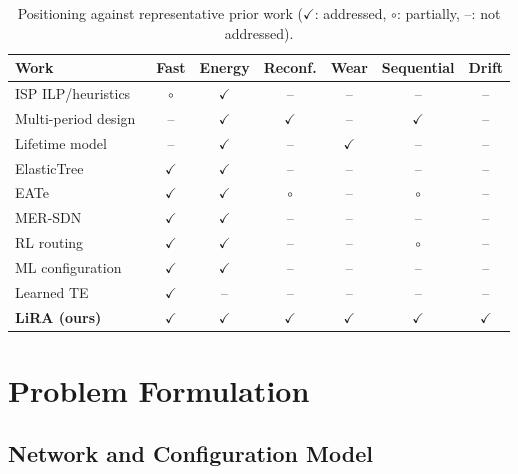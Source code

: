 \documentclass[conference]{IEEEtran}
\begin{document}
\begin{table}[t]
\centering
\caption{Positioning against representative prior work ($\checkmark$: addressed, $\circ$: partially, --: not addressed).}
\label{tab:related}
\footnotesize
\setlength{\tabcolsep}{3.2pt}
\begin{tabular}{@{}lcccccc@{}}
\toprule
Work & Fast & Energy & Reconf. & Wear & Sequential & Drift \\
\midrule
ISP ILP/heuristics~\cite{chiaraviglio2012minimizing} & $\circ$ & $\checkmark$ & -- & -- & -- & -- \\
Multi-period design~\cite{bonetto2013multiperiod} & -- & $\checkmark$ & $\checkmark$ & -- & $\checkmark$ & -- \\
Lifetime model~\cite{chiaraviglio2015lifetime} & -- & $\checkmark$ & -- & $\checkmark$ & -- & -- \\
ElasticTree~\cite{heller2010elastictree} & $\checkmark$ & $\checkmark$ & -- & -- & -- & -- \\
EATe~\cite{vasic2010eate} & $\checkmark$ & $\checkmark$ & $\circ$ & -- & $\circ$ & -- \\
MER-SDN~\cite{assefa2018mersdn} & $\checkmark$ & $\checkmark$ & -- & -- & -- & -- \\
RL routing~\cite{frohlich2021rl} & $\checkmark$ & $\checkmark$ & -- & -- & $\circ$ & -- \\
ML configuration~\cite{gomezdelahiz2025noms,gomezdelahiz2026tgcn} & $\checkmark$ & $\checkmark$ & -- & -- & -- & -- \\
Learned TE~\cite{xu2023teal,perry2023dote} & $\checkmark$ & -- & -- & -- & -- & -- \\
\midrule
\textbf{LiRA (ours)} & $\checkmark$ & $\checkmark$ & $\checkmark$ & $\checkmark$ & $\checkmark$ & $\checkmark$ \\
\bottomrule
\end{tabular}
\end{table}

\section{Problem Formulation}\label{sec:problem}

\subsection{Network and Configuration Model}
\end{document}
